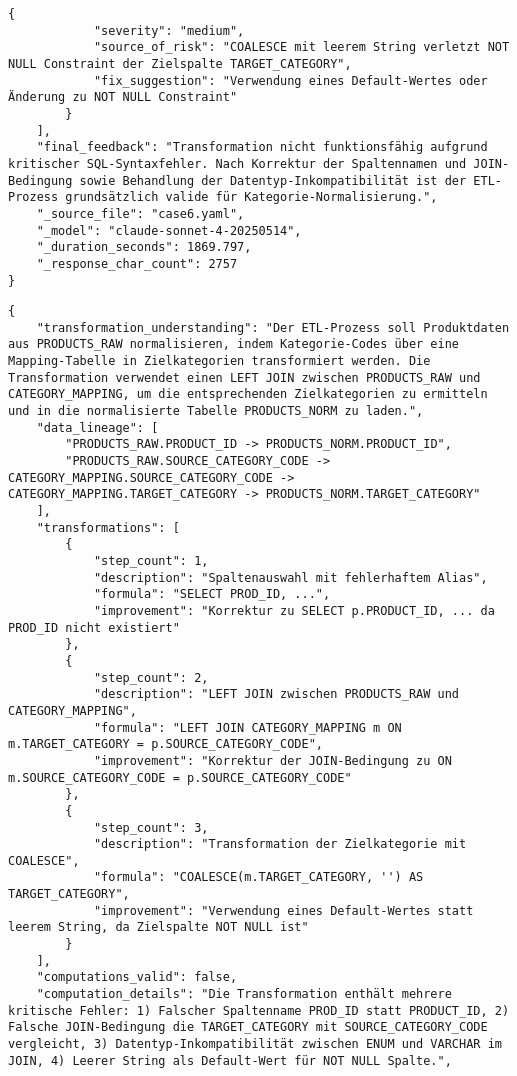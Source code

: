 \begin{lstlisting}[caption={Ausgabe: Claude Sonnet 4 Anwendungsfall 6 Konsistenzdurchlauf},label={claude_case6_prompt2}]
        {
            "severity": "medium",
            "source_of_risk": "COALESCE mit leerem String verletzt NOT NULL Constraint der Zielspalte TARGET_CATEGORY",
            "fix_suggestion": "Verwendung eines Default-Wertes oder Änderung zu NOT NULL Constraint"
        }
    ],
    "final_feedback": "Transformation nicht funktionsfähig aufgrund kritischer SQL-Syntaxfehler. Nach Korrektur der Spaltennamen und JOIN-Bedingung sowie Behandlung der Datentyp-Inkompatibilität ist der ETL-Prozess grundsätzlich valide für Kategorie-Normalisierung.",
    "_source_file": "case6.yaml",
    "_model": "claude-sonnet-4-20250514",
    "_duration_seconds": 1869.797,
    "_response_char_count": 2757
}
\end{lstlisting}

\begin{lstlisting}[caption={Ausgabe: Claude Sonnet 4 Anwendungsfall 6 Robustheitsdurchlauf},label={claude_case6_prompt3}]
{
    "transformation_understanding": "Der ETL-Prozess soll Produktdaten aus PRODUCTS_RAW normalisieren, indem Kategorie-Codes über eine Mapping-Tabelle in Zielkategorien transformiert werden. Die Transformation verwendet einen LEFT JOIN zwischen PRODUCTS_RAW und CATEGORY_MAPPING, um die entsprechenden Zielkategorien zu ermitteln und in die normalisierte Tabelle PRODUCTS_NORM zu laden.",
    "data_lineage": [
        "PRODUCTS_RAW.PRODUCT_ID -> PRODUCTS_NORM.PRODUCT_ID",
        "PRODUCTS_RAW.SOURCE_CATEGORY_CODE -> CATEGORY_MAPPING.SOURCE_CATEGORY_CODE -> CATEGORY_MAPPING.TARGET_CATEGORY -> PRODUCTS_NORM.TARGET_CATEGORY"
    ],
    "transformations": [
        {
            "step_count": 1,
            "description": "Spaltenauswahl mit fehlerhaftem Alias",
            "formula": "SELECT PROD_ID, ...",
            "improvement": "Korrektur zu SELECT p.PRODUCT_ID, ... da PROD_ID nicht existiert"
        },
        {
            "step_count": 2,
            "description": "LEFT JOIN zwischen PRODUCTS_RAW und CATEGORY_MAPPING",
            "formula": "LEFT JOIN CATEGORY_MAPPING m ON m.TARGET_CATEGORY = p.SOURCE_CATEGORY_CODE",
            "improvement": "Korrektur der JOIN-Bedingung zu ON m.SOURCE_CATEGORY_CODE = p.SOURCE_CATEGORY_CODE"
        },
        {
            "step_count": 3,
            "description": "Transformation der Zielkategorie mit COALESCE",
            "formula": "COALESCE(m.TARGET_CATEGORY, '') AS TARGET_CATEGORY",
            "improvement": "Verwendung eines Default-Wertes statt leerem String, da Zielspalte NOT NULL ist"
        }
    ],
    "computations_valid": false,
    "computation_details": "Die Transformation enthält mehrere kritische Fehler: 1) Falscher Spaltenname PROD_ID statt PRODUCT_ID, 2) Falsche JOIN-Bedingung die TARGET_CATEGORY mit SOURCE_CATEGORY_CODE vergleicht, 3) Datentyp-Inkompatibilität zwischen ENUM und VARCHAR im JOIN, 4) Leerer String als Default-Wert für NOT NULL Spalte.",

\end{lstlisting}
